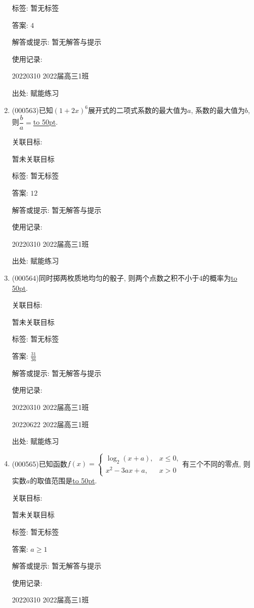 \documentclass[10pt,a4paper]{article}
\newcommand{\blank}[1]{\underline{\hbox to #1pt{}}}
\begin{document}
\begin{enumerate}[1.]
标签: 暂无标签

答案: $4$

解答或提示: 暂无解答与提示

使用记录:

20220310	2022届高三1班	


出处: 赋能练习
\item { (000563)}已知$(1+2x)^6$展开式的二项式系数的最大值为$a$, 系数的最大值为$b$, 则$\dfrac ba=$\blank{50}.


关联目标:

暂未关联目标



标签: 暂无标签

答案: $12$

解答或提示: 暂无解答与提示

使用记录:

20220310	2022届高三1班	


出处: 赋能练习
\item { (000564)}同时掷两枚质地均匀的骰子, 则两个点数之积不小于$4$的概率为\blank{50}.


关联目标:

暂未关联目标



标签: 暂无标签

答案: $\frac{31}{36}$

解答或提示: 暂无解答与提示

使用记录:

20220310	2022届高三1班	

20220622	2022届高三1班  	


出处: 赋能练习
\item { (000565)}已知函数$f(x)=\begin{cases} \log_2 (x+a), & x\le 0, \\ x^2-3ax+a, & x>0 \end{cases}$有三个不同的零点, 则实数$a$的取值范围是\blank{50}.


关联目标:

暂未关联目标



标签: 暂无标签

答案: $a\ge 1$

解答或提示: 暂无解答与提示

使用记录:

20220310	2022届高三1班	



\end{enumerate}
\end{document}
